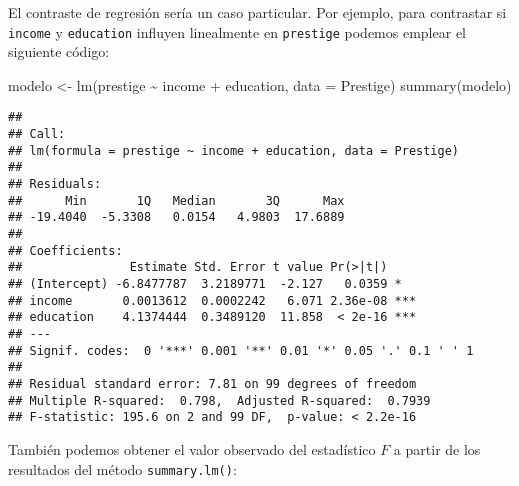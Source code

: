 \documentclass[
]{book}
\newenvironment{Shaded}{\begin{snugshade}}{\end{snugshade}}
\newcommand{\AttributeTok}[1]{\textcolor[rgb]{0.77,0.63,0.00}{#1}}
\newcommand{\CommentTok}[1]{\textcolor[rgb]{0.56,0.35,0.01}{\textit{#1}}}
\newcommand{\DecValTok}[1]{\textcolor[rgb]{0.00,0.00,0.81}{#1}}
\newcommand{\FunctionTok}[1]{\textcolor[rgb]{0.00,0.00,0.00}{#1}}
\newcommand{\NormalTok}[1]{#1}
\newcommand{\OtherTok}[1]{\textcolor[rgb]{0.56,0.35,0.01}{#1}}
\newcommand{\SpecialCharTok}[1]{\textcolor[rgb]{0.00,0.00,0.00}{#1}}
\theoremstyle{break}
\theoremstyle{definition}
\theoremstyle{definition}
\theoremstyle{definition}
\theoremstyle{definition}
\theoremstyle{remark}
\begin{document}
El contraste de regresión sería un caso particular. Por ejemplo,
para contrastar si \texttt{income} y \texttt{education} influyen linealmente en \texttt{prestige}
podemos emplear el siguiente código:

\begin{Shaded}
\begin{Highlighting}[]
\NormalTok{modelo }\OtherTok{\textless{}{-}} \FunctionTok{lm}\NormalTok{(prestige }\SpecialCharTok{\textasciitilde{}}\NormalTok{ income }\SpecialCharTok{+}\NormalTok{ education, }\AttributeTok{data =}\NormalTok{ Prestige)}
\FunctionTok{summary}\NormalTok{(modelo)}
\end{Highlighting}
\end{Shaded}

\begin{verbatim}
## 
## Call:
## lm(formula = prestige ~ income + education, data = Prestige)
## 
## Residuals:
##      Min       1Q   Median       3Q      Max 
## -19.4040  -5.3308   0.0154   4.9803  17.6889 
## 
## Coefficients:
##               Estimate Std. Error t value Pr(>|t|)    
## (Intercept) -6.8477787  3.2189771  -2.127   0.0359 *  
## income       0.0013612  0.0002242   6.071 2.36e-08 ***
## education    4.1374444  0.3489120  11.858  < 2e-16 ***
## ---
## Signif. codes:  0 '***' 0.001 '**' 0.01 '*' 0.05 '.' 0.1 ' ' 1
## 
## Residual standard error: 7.81 on 99 degrees of freedom
## Multiple R-squared:  0.798,  Adjusted R-squared:  0.7939 
## F-statistic: 195.6 on 2 and 99 DF,  p-value: < 2.2e-16
\end{verbatim}

También podemos obtener el valor observado del estadístico \(F\)
a partir de los resultados del método \texttt{summary.lm()}:

\begin{Shaded}
\end{Shaded}
\end{document}

